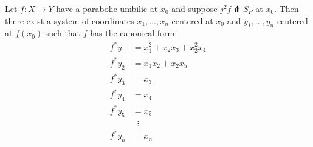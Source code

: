 Let $f: X \to Y$ have a parabolic umbilic at $x_0$ and suppose $j^2 f \pitchfork S_P$ at $x_0$. Then there exist a system of coordinates $x_1, \ldots, x_n$ centered at $x_0$ and $y_1, \ldots, y_n$ centered at $f(x_0)$ such that $f$ has the canonical form:
$$
\begin{aligned}
f^* y_1 &= x_1^2 + x_2 x_3 + x_2^2 x_4 \\
f^* y_2 &= x_1 x_2 + x_2 x_5 \\
f^* y_3 &= x_3 \\
f^* y_4 &= x_4 \\
f^* y_5 &= x_5 \\
&\;\;\vdots \\
f^* y_n &= x_n
\end{aligned}
$$
